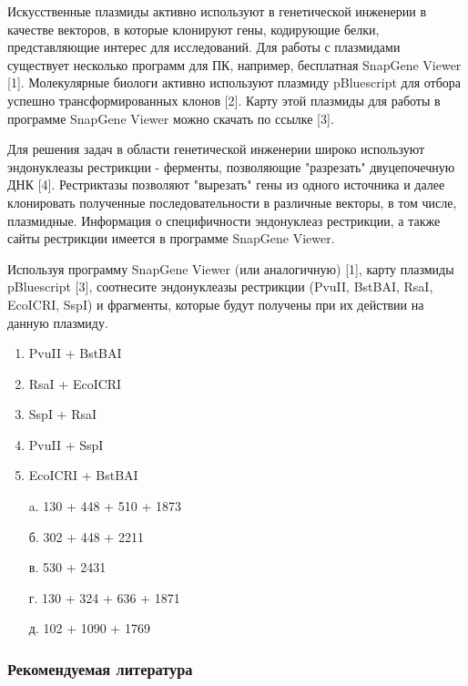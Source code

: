 
Искусственные плазмиды активно используют в генетической инженерии в качестве векторов, в которые клонируют гены, кодирующие белки, представляющие интерес для исследований. Для работы с плазмидами существует несколько программ для ПК, например, бесплатная SnapGene Viewer [1].
Молекулярные биологи активно используют плазмиду pBluescript для отбора успешно трансформированных клонов [2]. Карту этой плазмиды для работы в программе SnapGene Viewer можно скачать по ссылке [3]. 

Для решения задач в области генетической инженерии широко используют эндонуклеазы рестрикции - ферменты, позволяющие "разрезать" двуцепочечную ДНК [4]. Рестриктазы позволяют "вырезать" гены из одного источника и далее клонировать полученные последовательности в различные векторы, в том числе, плазмидные. Информация о специфичности эндонуклеаз рестрикции, а также сайты рестрикции имеется в программе SnapGene Viewer.

Используя программу SnapGene Viewer (или аналогичную) [1], карту плазмиды pBluescript [3], соотнесите эндонуклеазы рестрикции (PvuII, BstBAI, RsaI, EcoICRI, SspI) и фрагменты, которые будут получены при их действии на данную плазмиду. 

\begin{multicols}{2}
    {
        \begin{enumerate}
            \item PvuII + BstBAI
            \item RsaI + EcoICRI
            \item SspI + RsaI
            \item PvuII + SspI
            \item EcoICRI + BstBAI
        \end{enumerate}
    }
    {
        \begin{enumerate}
            \item[a.] 130 + 448 + 510 + 1873
            \item[б.] 302 + 448 + 2211
            \item[в.] 530 + 2431
            \item[г.] 130 + 324 + 636 + 1871
            \item[д.] 102 + 1090 + 1769
        \end{enumerate}
    }
    
\end{multicols}

\subsubsection*{Рекомендуемая литература}

